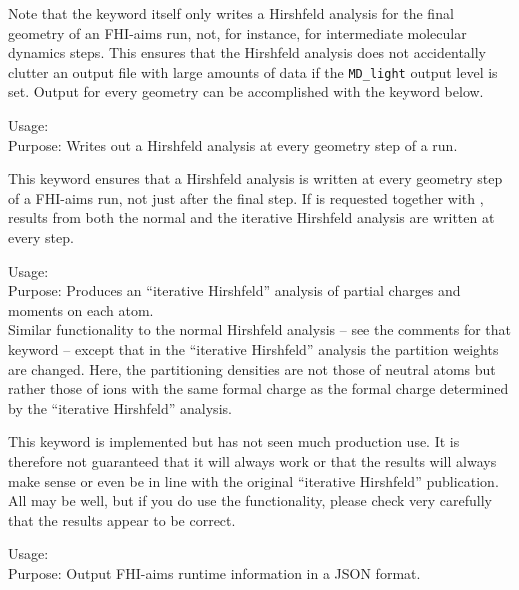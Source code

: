 Note that the   keyword itself
only writes a Hirshfeld analysis for the final geometry of an FHI-aims
run, not, for
instance, for intermediate molecular dynamics steps. This ensures that the
Hirshfeld analysis does not accidentally clutter an output file with large
amounts of data if the  \texttt{MD\_light}
output level is set. Output for every geometry can be accomplished
with the  
keyword below.

{
  \noindent
  Usage:   \\[1.0ex]
  Purpose: Writes out a Hirshfeld analysis at every geometry step of a run. \\[1.0ex]
}

This keyword ensures that a Hirshfeld analysis is written at every
geometry step of a FHI-aims run, not just after the final step.
If   is requested
together with  ,
results from both the normal and the iterative Hirshfeld analysis are
written at every step.

{
  \noindent
  Usage:   \\[1.0ex]
  Purpose: Produces an ``iterative Hirshfeld'' analysis of partial charges and
    moments on each atom. \\[1.0ex]
}
Similar functionality to the normal 
 Hirshfeld analysis -- see the comments
for that keyword -- except that in the ``iterative Hirshfeld'' \cite{Bultinck07}
analysis the partition weights are changed. Here, the partitioning
densities are not those of neutral atoms but rather those of ions with
the same formal charge as the formal charge determined by the
``iterative Hirshfeld'' analysis.

This keyword is implemented but has not seen much production use. It
is therefore not guaranteed that it will always work or that the
results will always make sense or even be in line with the original
``iterative Hirshfeld'' publication.\cite{Bultinck07} All may be well, but if you do
use the functionality, please check very carefully that the results
appear to be correct.

{
  \noindent
  Usage:    \\[1.0ex]
  Purpose: Output FHI-aims runtime information in a JSON format. \\
}

